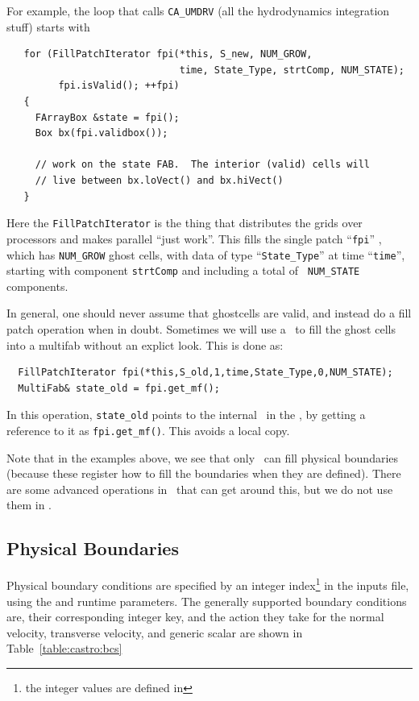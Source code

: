 \begin{itemize}
  For example, the loop that calls {\tt CA\_UMDRV} (all the
  hydrodynamics integration stuff) starts with
\begin{lstlisting}
   for (FillPatchIterator fpi(*this, S_new, NUM_GROW,
                              time, State_Type, strtComp, NUM_STATE);
         fpi.isValid(); ++fpi)
   {
     FArrayBox &state = fpi();
     Box bx(fpi.validbox());

     // work on the state FAB.  The interior (valid) cells will 
     // live between bx.loVect() and bx.hiVect()
   }
\end{lstlisting}
Here the {\tt FillPatchIterator} is the thing that distributes the
grids over processors and makes parallel ``just work''. This fills the
single patch ``{\tt fpi}'' , which has {\tt NUM\_GROW} ghost cells,
with data of type ``{\tt State\_Type}'' at time ``{\tt time}'',
starting with component {\tt strtComp} and including a total of {\tt
  NUM\_STATE} components. 

\end{itemize}

In general, one should never assume that ghostcells are valid, and
instead do a fill patch operation when in doubt.  Sometimes we will
use a \fillpatchiterator\ to fill the ghost cells into a multifab
without an explict look.  This is done as:
\begin{lstlisting}
  FillPatchIterator fpi(*this,S_old,1,time,State_Type,0,NUM_STATE);
  MultiFab& state_old = fpi.get_mf();     
\end{lstlisting}
In this operation, {\tt state\_old} points to the internal
\multifab\ in the \fillpatchiterator, by getting a reference to it as
              {\tt fpi.get\_mf()}.  This avoids a local copy.

Note that in the examples above, we see that only \statedata\ can fill
physical boundaries (because these register how to fill the boundaries
when they are defined).  There are some advanced operations in
\boxlib\ that can get around this, but we do not use them in \castro.  

\subsection{Physical Boundaries}

Physical boundary conditions are specified by an integer
index\footnote{the integer values are defined in } in
  the inputs file, using the  and
   runtime parameters.  The generally
  supported boundary conditions are, their corresponding integer key,
  and the action they take for the normal velocity, transverse
  velocity, and generic scalar are shown in Table~\ref{table:castro:bcs}

